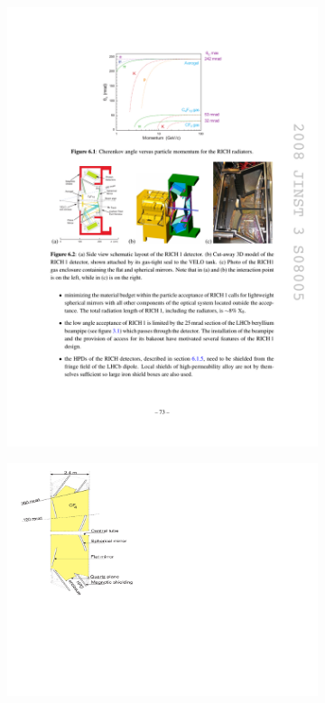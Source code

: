 \begin{figure}[!h]
    \centering
    \begin{subfigure}[t]{0.4\textwidth}
        \centering        
        \includegraphics[width=1.0\textwidth]{figs/Detector/richone_layout.pdf}
        \caption{\richone}
    \end{subfigure}
    \begin{subfigure}[t]{0.4\textwidth}
        \centering
        \includegraphics[width=1.0\textwidth]{figs/Detector/richtwo_layout_2.pdf}

\end{subfigure}
\end{figure}
